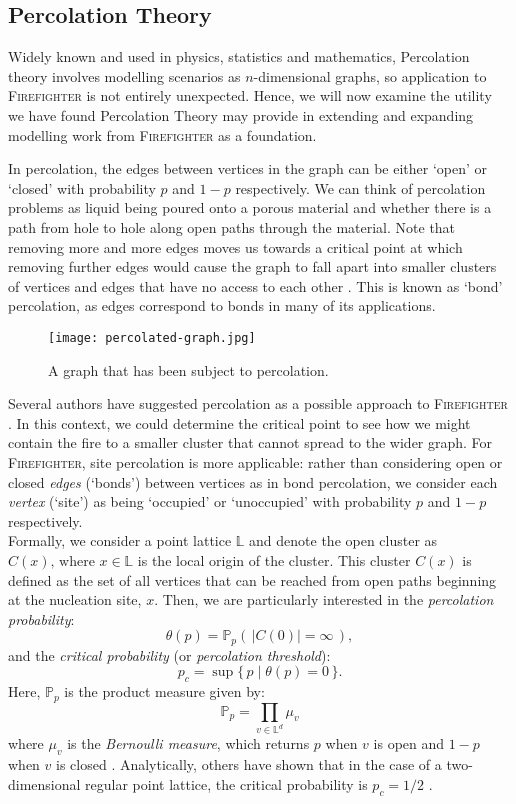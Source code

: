 \documentclass[../report.tex]{subfiles}
\begin{document}
\subsection{Percolation Theory}
\label{sec:perc}

Widely known and used in physics, statistics and mathematics, Percolation theory involves modelling scenarios as $n$-dimensional graphs, so application to {\scshape Firefighter} is not entirely unexpected. Hence, we will now examine the utility we have found Percolation Theory may provide in extending and expanding modelling work from {\scshape Firefighter} as a foundation.

In percolation, the edges between vertices in the graph can be either `open' or `closed' with probability $p$ and $1-p$ respectively. We can think of percolation problems as liquid being poured onto a porous material and whether there is a path from hole to hole along open paths through the material. Note that removing more and more edges moves us towards a critical point at which removing further edges would cause the graph to fall apart into smaller clusters of vertices and edges that have no access to each other \cite{grimmett_1999}. This is known as `bond' percolation, as edges correspond to bonds in many of its applications.\\
\begin{figure}[ht]
	\centering
		\texttt{[image: percolated-graph.jpg]}
	\caption{A graph that has been subject to percolation.}
	\label{fig:percolated-graph}
\end{figure}
Several authors have suggested percolation as a possible approach to {\scshape Firefighter} \cite{finbow_2009}. In this context, we could determine the critical point to see how we might contain the fire to a smaller cluster that cannot spread to the wider graph. For {\scshape Firefighter}, site percolation is more applicable: rather than considering open or closed \emph{edges} (`bonds') between vertices as in bond percolation, we consider each \emph{vertex} (`site') as being `occupied' or `unoccupied' with probability $p$ and $1-p$ respectively.\\

Formally, we consider a point lattice $\mathbb{L}$ and denote the open cluster as $C(x)\text{,~where~}x\in\mathbb{L}$ is the local origin of the cluster. This cluster $C(x)$ is defined as the set of all vertices that can be reached from open paths beginning at the nucleation site, $x$. Then, we are particularly interested in the \emph{percolation probability}:
$$
\theta(p) = \mathbb{P}_p(\,|C(0)|=\infty\,),
$$
and the \emph{critical probability} (or \emph{percolation threshold}):
$$
p_c = \sup\{\,p \mid \theta(p)=0\,\}.
$$
Here, $\mathbb{P}_p$ is the product measure given by:
$$
\displaystyle \mathbb{P}_p=\prod_{v\in\mathbb{L}^d}\mu_v
$$
where $\mu_v$ is the \emph{Bernoulli measure}, which returns $p$ when $v$ is open and $1-p$ when $v$ is closed \cite[p. 28]{klenke_2014}. Analytically, others have shown that in the case of a two-dimensional regular point lattice, the critical probability is $p_c=1/2$ \cite{kersten_1980}.
\end{document}
